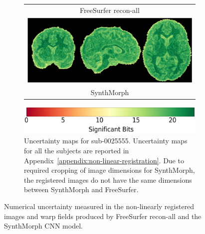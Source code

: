 \begin{figure}[t]
\begin{subfigure}[b]{0.48\linewidth}
\begin{tabular}{c}
        \scriptsize{FreeSurfer recon-all} \\
        \includegraphics[width=\linewidth]{figures3/special_fig/sm_sub-0025555_sigmap.eps} \\
        \scriptsize{SynthMorph} 
  \end{tabular}
  \centering
  \includegraphics[width=\textwidth]{figures3/colorbar.eps}
  \caption{Uncertainty maps for sub-0025555. Uncertainty maps for all the subjects are reported in Appendix~\ref{appendix:non-linear-registration}. Due to required cropping of image dimensions for SynthMorph, the registered images do not have the same dimensions between SynthMorph and FreeSurfer.}
  \label{tbl:table_of_figures}
  \end{subfigure}
  \caption{Numerical uncertainty measured in the non-linearly registered images and warp fields produced by FreeSurfer recon-all and the SynthMorph CNN model. } 
\vspace*{-0.5cm}                                                           

\end{figure}

